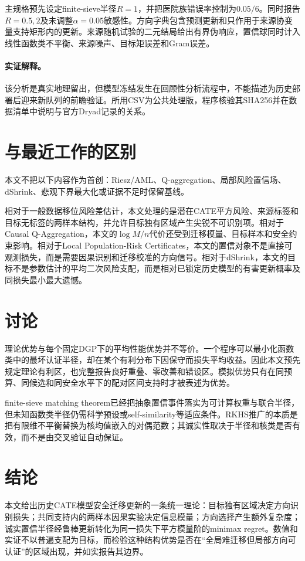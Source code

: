 \documentclass[UTF8,12pt]{ctexart}
\begin{document}
主规格预先设定finite-sieve半径$R=1$，并把医院族错误率控制为$0.05/6$。同时报告$R=0.5,2$及未调整$\alpha=0.05$敏感性。方向字典包含预测更新和只作用于来源协变量支持矩形内的更新。来源随机试验的二元结局给出有界伪响应，置信球同时计入线性函数类不平衡、来源噪声、目标矩误差和Gram误差。


\paragraph{实证解释。}
该分析是真实地理留出，但模型冻结发生在回顾性分析流程中，不能描述为历史部署后迎来新队列的前瞻验证。所用CSV为公共处理版，程序核验其SHA256并在数据清单中说明与官方Dryad记录的关系。

\section{与最近工作的区别}
本文不把以下内容作为首创：Riesz/AML、Q-aggregation、局部风险置信场、dShrink、悲观下界最大化或证据不足时保留基线。

相对于一般数据移位风险差估计，本文处理的是潜在CATE平方风险、来源标签和目标无标签的两样本结构，并允许目标独有区域产生尖锐不可识别项。相对于Causal Q-Aggregation，本文的$\log M/n$代价还受到迁移模量、目标样本和安全约束影响。相对于Local Population-Risk Certificates，本文的置信对象不是直接可观测损失，而是需要因果识别和迁移校准的方向信号。相对于dShrink，本文的目标不是参数估计的平均二次风险支配，而是相对已锁定历史模型的有害更新概率及同损失最小最大遗憾。

\section{讨论}
理论优势与每个固定DGP下的平均性能优势并不等价。一个程序可以最小化函数类中的最坏认证半径，却在某个有利分布下因保守而损失平均收益。因此本文预先规定理论有利区，也完整报告良好重叠、零改善和错设区。模拟优势只有在同预算、同候选和同安全水平下的配对区间支持时才被表述为优势。

finite-sieve matching theorem已经把抽象置信事件落实为可计算权重与联合半径，但未知函数类半径仍需科学预设或self-similarity等适应条件。RKHS推广的本质是把有限维不平衡替换为核均值嵌入的对偶范数；其诚实性取决于半径和核类是否有效，而不是由交叉验证自动保证。

\section{结论}
本文给出历史CATE模型安全迁移更新的一条统一理论：目标独有区域决定方向识别损失；共同支持内的两样本因果实验决定信息模量；方向选择产生额外复杂度；诚实置信半径经鲁棒更新转化为同一损失下平方模量阶的minimax regret。数值和实证不以普遍支配为目标，而检验这种结构优势是否在“全局难迁移但局部方向可认证”的区域出现，并如实报告其边界。
\end{document}
